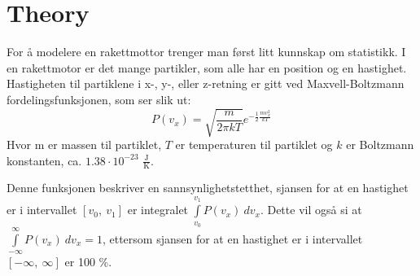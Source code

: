 \documentclass[reprint,english,notitlepage]{revtex4-1}
\begin{document}
\section{Theory}
	For å modelere en rakettmottor trenger man først litt kunnskap om statistikk.
	I en rakettmotor er det mange partikler, som alle har en position og en hastighet.
	Hastigheten til partiklene i x-, y-, eller z-retning er gitt ved Maxvell-Boltzmann
	fordelingsfunksjonen, som ser slik ut:
	$$
		P(v_x) = \sqrt{\frac{m}{2\pi k T}}e^{-\frac{1}{2}\frac{mv_x^2}{kT}}
	$$
	Hvor m er massen til partiklet, $T$ er temperaturen til partiklet og $k$ er
	Boltzmann konstanten, ca. $1.38 \cdot 10^{-23}$ $\frac{\text{J}}{\text{K}}$.

	Denne funksjonen beskriver en sannsynlighetstetthet, sjansen for at en hastighet
	er i intervallet $[v_0,\ v_1]$ er integralet $\int\limits_{v_0}^{v_1} P(v_x)\ dv_x$.
	Dette vil også si at $\int\limits_{-\infty}^{\infty} P(v_x)\ dv_x = 1$, ettersom
	sjansen for at en hastighet er i intervallet $[-\infty,\ \infty]$ er 100 \%.
\end{document}
